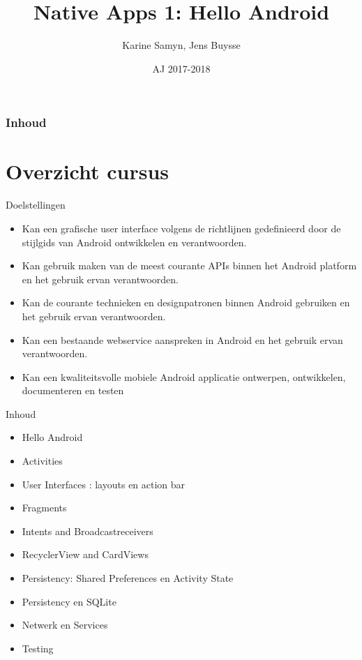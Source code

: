 \documentclass{beamer}
\title[Intro]{Native Apps 1: Hello Android}
\author{Karine Samyn, Jens Buysse}
\date{AJ 2017-2018}
\begin{document}

\HoGentLogo

\titleframe


\begin{frame}
  \frametitle{Inhoud}

  \tableofcontents
\end{frame}


\section{Overzicht cursus}

\sectionframe{}

\begin{frame}{Doelstellingen}
\begin{itemize}
	\item Kan een grafische user interface volgens de richtlijnen gedefinieerd door de stijlgids van Android ontwikkelen en verantwoorden.
\item	Kan gebruik maken van de meest courante APIs binnen het Android platform en het gebruik ervan verantwoorden. 
\item	Kan de courante technieken en designpatronen binnen Android gebruiken en het gebruik ervan verantwoorden. 
\item	Kan een bestaande webservice aanspreken in Android en het gebruik ervan verantwoorden. 
\item	Kan een kwaliteitsvolle mobiele Android applicatie ontwerpen, ontwikkelen, documenteren en testen 
\end{itemize}
	
\end{frame}

\begin{frame}{Inhoud}
\begin{itemize}
	\item Hello Android
	\item	Activities
	\item	User Interfaces : layouts en action bar
	\item Fragments 
	\item	Intents and Broadcastreceivers
	\item RecyclerView and CardViews
	\item  Persistency: Shared Preferences en Activity State
	\item  Persistency en SQLite
	\item Netwerk en Services
	\item Testing
\end{itemize}

\end{frame}
\end{document}
